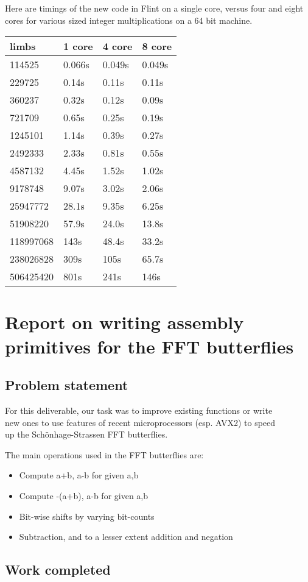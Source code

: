 Here are timings of the new code in Flint on a single core, versus four
and eight cores for various sized integer multiplications on a 64 bit
machine.

\begin{longtable}[c]{@{}llll@{}}
\toprule
limbs & 1 core & 4 core & 8 core\tabularnewline
\midrule
\endhead
114525 & 0.066s & 0.049s & 0.049s\tabularnewline
229725 & 0.14s & 0.11s & 0.11s\tabularnewline
360237 & 0.32s & 0.12s & 0.09s\tabularnewline
721709 & 0.65s & 0.25s & 0.19s\tabularnewline
1245101 & 1.14s & 0.39s & 0.27s\tabularnewline
2492333 & 2.33s & 0.81s & 0.55s\tabularnewline
4587132 & 4.45s & 1.52s & 1.02s\tabularnewline
9178748 & 9.07s & 3.02s & 2.06s\tabularnewline
25947772 & 28.1s & 9.35s & 6.25s\tabularnewline
51908220 & 57.9s & 24.0s & 13.8s\tabularnewline
118997068 & 143s & 48.4s & 33.2s\tabularnewline
238026828 & 309s & 105s & 65.7s\tabularnewline
506425420 & 801s & 241s & 146s\tabularnewline
\bottomrule
\end{longtable}

\section*{Report on writing assembly primitives for the FFT
butterflies}\label{report-on-writing-assembly-primitives-for-the-fft-butterflies}

\subsection{Problem statement}\label{problem-statement}

For this deliverable, our task was to improve existing functions or
write\\
new ones to use features of recent microprocessors (esp. AVX2) to
speed\\
up the Schönhage-Strassen FFT butterflies.

The main operations used in the FFT butterflies are:

\begin{itemize}
\tightlist
\item
  Compute a+b, a-b for given a,b
\item
  Compute -(a+b), a-b for given a,b
\item
  Bit-wise shifts by varying bit-counts
\item
  Subtraction, and to a lesser extent addition and negation
\end{itemize}

\subsection{Work completed}\label{work-completed}

